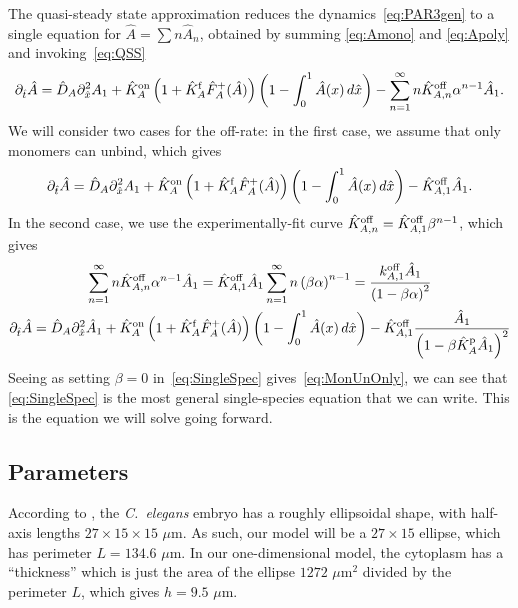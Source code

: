 \documentclass[11pt]{article}
\newcommand{\6}[1]{#1_{\text{6}}}
\newcommand{\3}[1]{#1_{\text{3}}}
\begin{document}
The quasi-steady state approximation reduces the dynamics\ \eqref{eq:PAR3gen} to a single equation for $\hat A=\sum n \hat A_n$, obtained by summing \eqref{eq:Amono} and \eqref{eq:Apoly} and invoking\ \eqref{eq:QSS}
\begin{equation}
\partial_{\hat{t}} \hat A = \hat{D}_A \partial_{\hat{x}}^2 A_1+\hat{K}^\text{on}_A \left(1+\hat{K}^\text{f}_A \hat F_A^+(\hat A) \right)\left(1 - \int_0^1 \hat A(x) \, d\hat{x} \right) - \sum_{n=1}^\infty n \hat{K}^\text{off}_{A,n}  \alpha^{n-1} \hat A_1.
\end{equation}
We will consider two cases for the off-rate: in the first case, we assume that only monomers can unbind, which gives \cite[Eq.~(14)]{lang2023oligomerization}
\begin{equation}
\label{eq:MonUnOnly}
\partial_{\hat{t}} \hat A = \hat{D}_A \partial_{\hat{x}}^2 A_1+\hat{K}^\text{on}_A \left(1+\hat{K}^\text{f}_A \hat F_A^+(\hat A) \right)\left(1 - \int_0^1 \hat A(x) \, d\hat{x} \right) - \hat{K}^\text{off}_{A,1}  \hat A_1.
\end{equation}
In the second case, we use the experimentally-fit curve $\hat{K}^\text{off}_{A,n}=\hat{K}^\text{off}_{A,1} \beta^{n-1}$, which gives 
\begin{gather}
\nonumber
\sum_{n=1}^\infty n \hat{K}^\text{off}_{A,n}  \alpha^{n-1} \hat A_1 = \hat{K}^\text{off}_{A,1} \hat A_1 \sum_{n=1}^\infty n \left(\beta \alpha\right)^{n-1}= \frac{k^\text{off}_{A,1} \hat A_1}{\left(1-\beta \alpha\right)^2}\\
\label{eq:SingleSpec}
\partial_{\hat{t}} \hat A = \hat{D}_A \partial_{\hat{x}}^2 \hat A_1+\hat{K}^\text{on}_A \left(1+\hat{K}^\text{f}_A \hat F_A^+(\hat A) \right)\left(1 - \int_0^1 \hat A(x) \, d\hat{x} \right) - \hat{K}^\text{off}_{A,1}  \frac{\hat A_1}{\left(1-\beta \hat{K}^\text{p}_A \hat A_1\right)^2}
\end{gather}
Seeing as setting $\beta=0$ in\ \eqref{eq:SingleSpec} gives\ \eqref{eq:MonUnOnly}, we can see that \eqref{eq:SingleSpec} is the most general single-species equation that we can write. This is the equation we will solve going forward.

\subsection{Parameters \label{sec:paramsP3}}
According to \cite{goehring2011polarization}, the \emph{C.\ elegans} embryo has a roughly ellipsoidal shape, with half-axis lengths $27 \times 15 \times 15$ $\mu$m. As such, our model will be a $27 \times 15$ ellipse, which has perimeter $L=134.6$ $\mu$m. In our one-dimensional model, the cytoplasm has a ``thickness'' which is just the area of the ellipse $1272$ $\mu$m$^2$ divided by the perimeter $L$, which gives $h=9.5$ $\mu$m.
\end{document}
